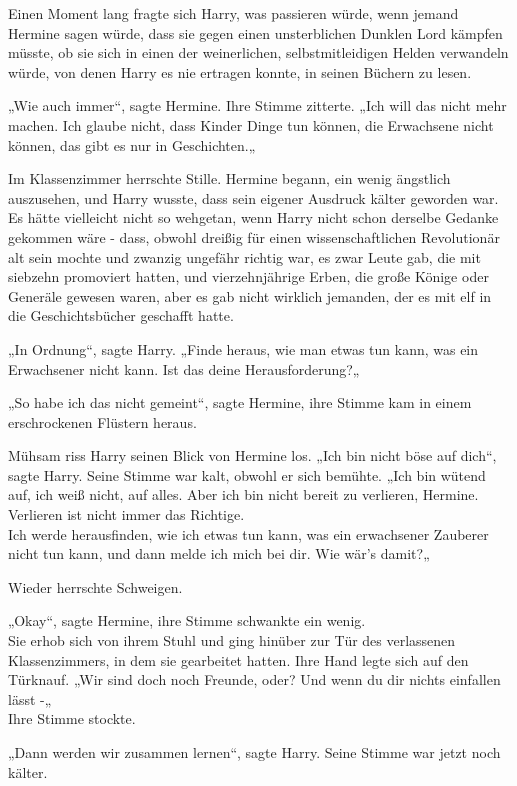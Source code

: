 {Einen Moment lang fragte sich Harry, was passieren würde, wenn jemand Hermine sagen würde, dass sie gegen einen unsterblichen Dunklen Lord kämpfen müsste, ob sie sich in einen der weinerlichen, selbstmitleidigen Helden verwandeln würde, von denen Harry es nie ertragen konnte, in seinen Büchern zu lesen.

„Wie auch immer“, sagte Hermine. Ihre Stimme zitterte. „Ich will das nicht mehr machen. Ich glaube nicht, dass Kinder Dinge tun können, die Erwachsene nicht können, das gibt es nur in Geschichten.„

Im Klassenzimmer herrschte Stille. Hermine begann, ein wenig ängstlich auszusehen, und Harry wusste, dass sein eigener Ausdruck kälter geworden war. Es hätte vielleicht nicht so wehgetan, wenn Harry nicht schon derselbe Gedanke gekommen wäre - dass, obwohl dreißig für einen wissenschaftlichen Revolutionär alt sein mochte und zwanzig ungefähr richtig war, es zwar Leute gab, die mit siebzehn promoviert hatten, und vierzehnjährige Erben, die große Könige oder Generäle gewesen waren, aber es gab nicht wirklich jemanden, der es mit elf in die Geschichtsbücher geschafft hatte.

„In Ordnung“, sagte Harry. „Finde heraus, wie man etwas tun kann, was ein Erwachsener nicht kann. Ist das deine Herausforderung?„

„So habe ich das nicht gemeint“, sagte Hermine, ihre Stimme kam in einem erschrockenen Flüstern heraus.

Mühsam riss Harry seinen Blick von Hermine los. „Ich bin nicht böse auf dich“, sagte Harry. Seine Stimme war kalt, obwohl er sich bemühte. „Ich bin wütend auf, ich weiß nicht, auf alles. Aber ich bin nicht bereit zu verlieren, Hermine. Verlieren ist nicht immer das Richtige.\\ Ich werde herausfinden, wie ich etwas tun kann, was ein erwachsener Zauberer nicht tun kann, und dann melde ich mich bei dir. Wie wär's damit?„

Wieder herrschte Schweigen.

„Okay“, sagte Hermine, ihre Stimme schwankte ein wenig.\\ Sie erhob sich von ihrem Stuhl und ging hinüber zur Tür des verlassenen Klassenzimmers, in dem sie gearbeitet hatten. Ihre Hand legte sich auf den Türknauf. „Wir sind doch noch Freunde, oder? Und wenn du dir nichts einfallen lässt -„\\ Ihre Stimme stockte.

„Dann werden wir zusammen lernen“, sagte Harry. Seine Stimme war jetzt noch kälter.

}
